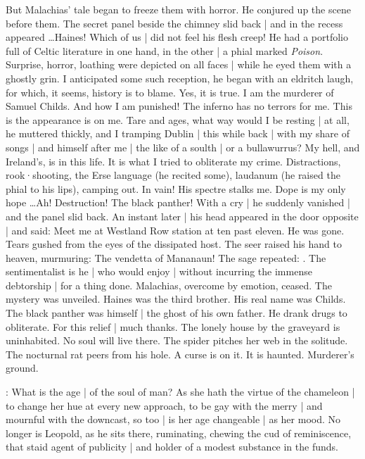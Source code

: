 But Malachias' tale began to freeze them with horror.
He conjured up the scene before them.
The secret panel beside the chimney slid back |
and in the recess appeared \dots Haines!
Which of us |
did not feel his flesh creep!
He had a portfolio full of Celtic literature in one hand,
in the other |
a phial marked \emph{Poison}.
Surprise,
horror,
loathing were depicted on all faces |
while he eyed them with a ghostly grin.
I anticipated some such reception,
he began with an eldritch laugh,
for which,
it seems,
history is to blame.
Yes,
it is true.
I am the murderer of Samuel Childs.
And how I am punished!
The inferno has no terrors for me.
This is the appearance is on me.
Tare and ages,
what way would I be resting |
at all,
he muttered
thickly,
and I tramping Dublin |
this while back |
with my share of songs |
and himself after me |
the like of a soulth |
or a bullawurrus?
My hell,
and Ireland's,
is in this life.
It is what I tried to obliterate my crime.
Distractions,
rook·shooting,
the Erse language
(he recited some),
laudanum
(he raised the phial to his lips),
camping out.
In vain!
His spectre stalks me.
Dope is my only hope \dots Ah!
Destruction!
The black panther!
With a cry |
he suddenly vanished |
and the panel slid back.
An instant later |
his head appeared in the door opposite |
and said:
Meet me at Westland Row station at ten past eleven.
He was gone.
Tears gushed from the eyes of the dissipated host.
The seer raised his hand to heaven,
murmuring:
The vendetta of Mananaun!
The sage repeated:
.
The sentimentalist is he |
who would enjoy |
without incurring the immense debtorship |
for a thing done.
Malachias,
overcome by emotion,
ceased.
The mystery was unveiled.
Haines was the third brother.
His real name was Childs.
The black panther was himself |
the ghost of his own father.
He drank drugs to obliterate.
For this relief |
much thanks.
The lonely house by the graveyard is uninhabited.
No soul will live there.
The spider pitches her web in the solitude.
The nocturnal rat peers from his hole.
A curse is on it.
It is haunted.
Murderer's ground.



:
What is the age |
of the soul of man?
As she hath the virtue of the chameleon |
to change her hue at every new approach,
to be gay with the merry |
and mournful with the downcast,
so too |
is her age changeable |
as her mood.
No longer is Leopold,
as he sits there,
ruminating,
chewing the cud of reminiscence,
that staid agent of publicity |
and holder of a modest substance in the funds.

